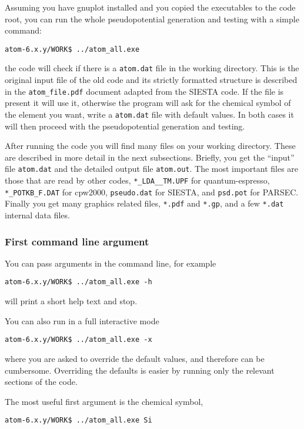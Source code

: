 \documentclass[11pt]{article}
\begin{document}
Assuming you have gnuplot installed and you copied the executables to the code root, you can run
the whole pseudopotential generation and testing with a simple command:

\noindent\texttt{atom-6.x.y/WORK\$ ../atom{\_}all.exe}

\noindent
the code will check if there is a \texttt{atom.dat} file in the working directory.
This is the original input file of the old code and its strictly formatted structure
is described in the \texttt{atom\_file.pdf} document adapted from the SIESTA code.
If the file is present it will use it, otherwise
the program will ask for the chemical symbol of the element you want,
write a \texttt{atom.dat} file with default values.  In both cases it will then proceed with
the pseudopotential generation and testing.

After running the code you will find many files on your working directory.
These are described in more detail in the next subsections.
Briefly, you get the ``input'' file \texttt{atom.dat} and the detailed output file
\texttt{atom.out}.  The most important files are those that are read by other codes,
\texttt{*\_LDA\_\_TM.UPF} for quantum-espresso, \texttt{*\_POTKB\_F.DAT} for cpw2000,
\texttt{pseudo.dat} for SIESTA, and \texttt{psd.pot} for PARSEC.
Finally you get many graphics related files, \texttt{*.pdf} and \texttt{*.gp},
and a few \texttt{*.dat} internal data files.

\subsubsection{First command line argument}

You can pass arguments in the command line, for example

\noindent\texttt{atom-6.x.y/WORK\$ ../atom{\_}all.exe -h}

\noindent
will print a short help text and stop.

You can also run in a full interactive mode

\noindent\texttt{atom-6.x.y/WORK\$ ../atom{\_}all.exe -x}

\noindent
where you are asked to override the default values, and therefore can be cumbersome.
Overriding the defaults is easier by running only the relevant sections of the code.

The most useful first argument is the chemical symbol,

\noindent\texttt{atom-6.x.y/WORK\$ ../atom{\_}all.exe Si}
\end{document}
